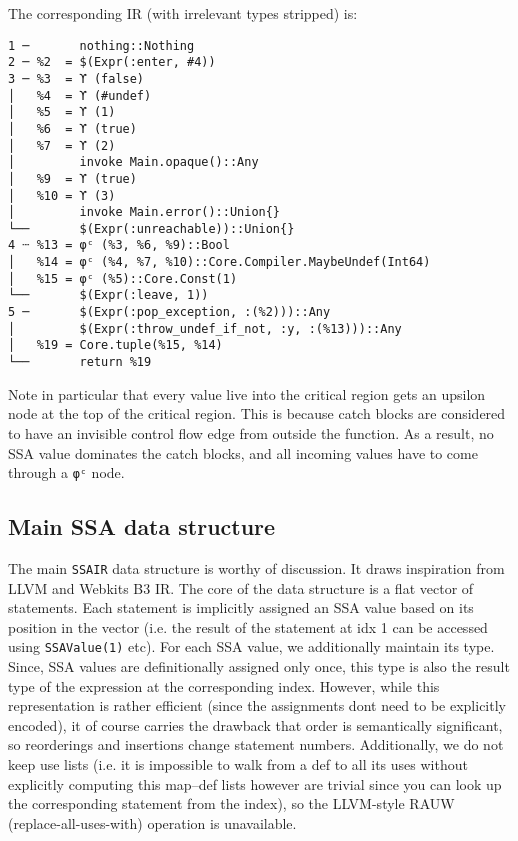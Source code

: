 The corresponding IR (with irrelevant types stripped) is:




\begin{lstlisting}
1 ─       nothing::Nothing
2 ─ %2  = $(Expr(:enter, #4))
3 ─ %3  = ϒ (false)
│   %4  = ϒ (#undef)
│   %5  = ϒ (1)
│   %6  = ϒ (true)
│   %7  = ϒ (2)
│         invoke Main.opaque()::Any
│   %9  = ϒ (true)
│   %10 = ϒ (3)
│         invoke Main.error()::Union{}
└──       $(Expr(:unreachable))::Union{}
4 ┄ %13 = φᶜ (%3, %6, %9)::Bool
│   %14 = φᶜ (%4, %7, %10)::Core.Compiler.MaybeUndef(Int64)
│   %15 = φᶜ (%5)::Core.Const(1)
└──       $(Expr(:leave, 1))
5 ─       $(Expr(:pop_exception, :(%2)))::Any
│         $(Expr(:throw_undef_if_not, :y, :(%13)))::Any
│   %19 = Core.tuple(%15, %14)
└──       return %19
\end{lstlisting}



Note in particular that every value live into the critical region gets an upsilon node at the top of the critical region. This is because catch blocks are considered to have an invisible control flow edge from outside the function. As a result, no SSA value dominates the catch blocks, and all incoming values have to come through a \texttt{φᶜ} node.



\hypertarget{13190851783504287053}{}


\subsection{Main SSA data structure}



The main \texttt{SSAIR} data structure is worthy of discussion. It draws inspiration from LLVM and Webkit{\textquotesingle}s B3 IR. The core of the data structure is a flat vector of statements. Each statement is implicitly assigned an SSA value based on its position in the vector (i.e. the result of the statement at idx 1 can be accessed using \texttt{SSAValue(1)} etc). For each SSA value, we additionally maintain its type. Since, SSA values are definitionally assigned only once, this type is also the result type of the expression at the corresponding index. However, while this representation is rather efficient (since the assignments don{\textquotesingle}t need to be explicitly encoded), it of course carries the drawback that order is semantically significant, so reorderings and insertions change statement numbers. Additionally, we do not keep use lists (i.e. it is impossible to walk from a def to all its uses without explicitly computing this map–def lists however are trivial since you can look up the corresponding statement from the index), so the LLVM-style RAUW (replace-all-uses-with) operation is unavailable.



